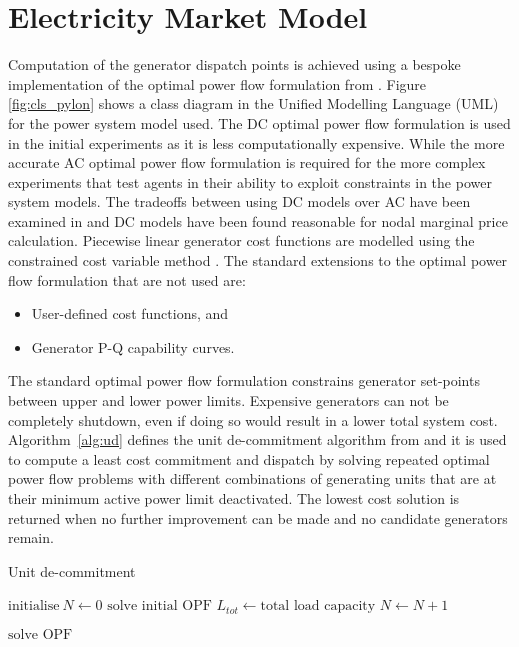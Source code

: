 \section{Electricity Market Model}
Computation of the generator dispatch points is achieved using a bespoke
implementation of the optimal power flow formulation from
\matpower \cite[\S5]{pserc:mp_manual}.  Figure \ref{fig:cls_pylon} shows a
class diagram in the Unified Modelling Language (UML) for the power system
model used.  The DC optimal power flow formulation is used in the initial experiments
as it is less computationally expensive.  While the more accurate AC optimal
power flow formulation is required for the more complex experiments that test
agents in their ability to exploit constraints in the power system models.
The tradeoffs between using DC models over AC have been examined in
 and DC models have been found reasonable for nodal
marginal price calculation.  Piecewise linear generator cost functions are
modelled using the constrained cost variable method \cite{zimmerman:ccv}.  The
standard extensions to the \matpower optimal power flow formulation that are
not used are:
\begin{itemize}
  \item User-defined cost functions, and
  \item Generator P-Q capability curves.
\end{itemize}

%

The standard optimal power flow formulation constrains generator set-points
between upper and lower power limits.  Expensive generators can not be
completely shutdown, even if doing so would result in a lower total system
cost.  Algorithm~\ref{alg:ud} defines the unit de-commitment algorithm from
 and it is used to compute a least cost commitment
and dispatch by solving repeated optimal power flow problems with different
combinations of generating units that are at their minimum active power limit
deactivated.  The lowest cost solution is returned when no further improvement
can be made and no candidate generators remain. \begin{algorithm}[H]
\caption{Unit de-commitment}
\label{alg:ud}
\begin{algorithmic}[1]
\STATE $\text{initialise}~N \leftarrow 0$
\STATE $\text{solve initial OPF}$
\STATE $L_{tot} \leftarrow \text{total load capacity}$
	\STATE $N \leftarrow N + 1$
\ENDWHILE

\REPEAT
		\STATE $\text{solve OPF}$
	\ENDFOR
{}
\end{algorithmic}
\end{algorithm}

